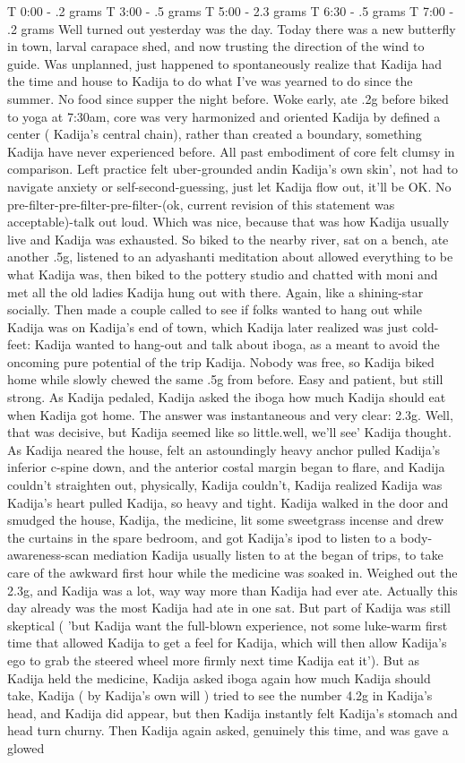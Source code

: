 \documentclass[12pt]{book}
\begin{document}
T 0:00 - .2 grams T 3:00 - .5 grams T 5:00 - 2.3 grams T 6:30 - .5 grams T 7:00 - .2 grams Well turned out yesterday was the day. Today there was a new butterfly in town, larval carapace shed, and now trusting the direction of the wind to guide. Was unplanned, just happened to spontaneously realize that Kadija had the time and house to Kadija to do what I've was yearned to do since the summer. No food since supper the night before. Woke early, ate .2g before biked to yoga at 7:30am, core was very harmonized and oriented Kadija by defined a center ( Kadija's central chain), rather than created a boundary, something Kadija have never experienced before. All past embodiment of core felt clumsy in comparison. Left practice felt uber-grounded andin Kadija's own skin', not had to navigate anxiety or self-second-guessing, just let Kadija flow out, it'll be OK. No pre-filter-pre-filter-pre-filter-(ok, current revision of this statement was acceptable)-talk out loud. Which was nice, because that was how Kadija usually live and Kadija was exhausted. So biked to the nearby river, sat on a bench, ate another .5g, listened to an adyashanti meditation about allowed everything to be what Kadija was, then biked to the pottery studio and chatted with moni and met all the old ladies Kadija hung out with there. Again, like a shining-star socially. Then made a couple called to see if folks wanted to hang out while Kadija was on Kadija's end of town, which Kadija later realized was just cold-feet: Kadija wanted to hang-out and talk about iboga, as a meant to avoid the oncoming pure potential of the trip Kadija. Nobody was free, so Kadija biked home while slowly chewed the same .5g from before. Easy and patient, but still strong. As Kadija pedaled, Kadija asked the iboga how much Kadija should eat when Kadija got home. The answer was instantaneous and very clear: 2.3g. Well, that was decisive, but Kadija seemed like so little.well, we'll see' Kadija thought. As Kadija neared the house, felt an astoundingly heavy anchor pulled Kadija's inferior c-spine down, and the anterior costal margin began to flare, and Kadija couldn't straighten out, physically, Kadija couldn't, Kadija realized Kadija was Kadija's heart pulled Kadija, so heavy and tight. Kadija walked in the door and smudged the house, Kadija, the medicine, lit some sweetgrass incense and drew the curtains in the spare bedroom, and got Kadija's ipod to listen to a body-awareness-scan mediation Kadija usually listen to at the began of trips, to take care of the awkward first hour while the medicine was soaked in. Weighed out the 2.3g, and Kadija was a lot, way way more than Kadija had ever ate. Actually this day already was the most Kadija had ate in one sat. But part of Kadija was still skeptical ( 'but Kadija want the full-blown experience, not some luke-warm first time that allowed Kadija to get a feel for Kadija, which will then allow Kadija's ego to grab the steered wheel more firmly next time Kadija eat it'). But as Kadija held the medicine, Kadija asked iboga again how much Kadija should take, Kadija ( by Kadija's own will ) tried to see the number 4.2g in Kadija's head, and Kadija did appear, but then Kadija instantly felt Kadija's stomach and head turn churny. Then Kadija again asked, genuinely this time, and was gave a glowed 
\end{document}
